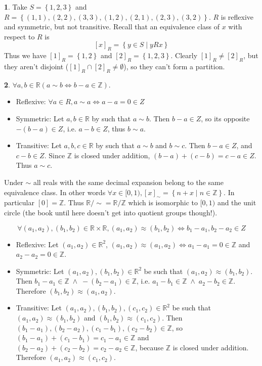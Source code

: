 \documentclass{article}
\theoremstyle{definition}
\newcommand{\bb}[1]{\mathbb{#1}}
\newcommand{\Z}{\bb{Z}}
\newcommand{\R}{\bb{R}}
\newcommand{\AND}{\;\wedge\;}
\newcommand{\set}[1]{\left\{#1\right\}}
\newcommand{\bra}[1]{\left[#1\right]}
\theoremstyle{definition}
\theoremstyle{definition}
\newtheorem{solution-internal}{}[subsection]
\newenvironment{solution}{
  \medskip
  \begin{solution-internal}
}{
  \end{solution-internal}
}
\begin{document}
\begin{solution}
Take $S = \set{1,2,3}$ and $R = \set{(1,1), (2,2), (3,3), (1,2), (2,1),
(2,3), (3,2)}$. $R$ is reflexive and symmetric, but not transitive. Recall that
an equivalence class of $x$ with respect to $R$ is
\[ \bra{x}_R = \set{y \in S \mid yRx} \]
Thus we have $\bra{1}_R = \set{1,2}$ and $\bra{2}_R = \set{1,2,3}$. Clearly
$\bra{1}_R \neq \bra{2}_R$, but they aren't disjoint ($\bra{1}_R \cap \bra{2}_R
\neq \emptyset$), so they can't form a partition.
\end{solution}

\begin{solution}
$\forall a, b \in \R (a \sim b \iff b - a \in \Z)$.
\begin{itemize}
\item Reflexive: $\forall a \in R, a \sim a \iff a - a = 0 \in Z$
\item Symmetric: Let $a,b \in \R$ by such that $a \sim b$. Then $b - a \in Z$, so its opposite $-(b-a) \in Z$, i.e. $a-b \in Z$, thus $b \sim a$.
\item Transitive: Let $a, b, c \in \R$ by such that $a \sim b$ and $b \sim c$. Then $b - a \in Z$, and $c - b \in Z$. Since $\Z$ is closed under addition, $(b-a) + (c-b) = c - a \in Z$. Thus $a \sim c$.
\end{itemize}
Under $\sim$ all reals with the same decimal expansion belong to the same
equivalence class. In other words $\forall x \in [0,1), \bra{x}_{\sim} = \set{n + x \mid n \in \Z}$.
In particular $\bra{0} = \Z$. Thus $\R/\sim = \R/\Z$ which is isomorphic to
$[0,1)$ and the unit circle (the book until here doesn't get into quotient
groups though!).

\[ \forall (a_1, a_2), (b_1, b_2) \in \R \times \R, (a_1, a_2) \approx (b_1, b_2) \iff b_1 - a_1, b_2 - a_2 \in Z \]

\begin{itemize}
\item Reflexive: Let $(a_1, a_2) \in \R^2$, $(a_1, a_2) \approx (a_1, a_2) \iff a_1 - a_1 = 0 \in \Z$ and $a_2 - a_2 = 0 \in \Z$.
\item Symmetric: Let $(a_1, a_2), (b_1, b_2) \in \R^2$ be such that $(a_1, a_2) \approx (b_1, b_2)$.
Then $b_1 - a_1 \in \Z \AND -(b_2 - a_1) \in \Z$, i.e.  $a_1 -b_1 \in \Z \AND a_2 - b_2 \in \Z$.
Therefore $(b_1, b_2) \approx (a_1, a_2)$.
\item Transitive: Let $(a_1, a_2), (b_1, b_2), (c_1, c_2) \in \R^2$ be such that $(a_1, a_2) \approx (b_1, b_2)$ and $(b_1, b_2) \approx (c_1, c_2)$. Then $(b_1 - a_1), (b_2 - a_2), (c_1 - b_1), (c_2 - b_2) \in \Z$, so $(b_1 - a_1) + (c_1 - b_1) = c_1 - a_1 \in \Z$ and $(b_2 - a_2) + (c_2 - b_2) = c_2 - a_2 \in \Z$, because $\Z$ is closed under addition. Therefore $(a_1, a_2) \approx (c_1, c_2)$.
\end{itemize}
\end{solution}
\end{document}
